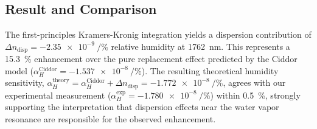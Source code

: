 \documentclass[aps,pra,reprint,groupedaddress,twocolumn,superscriptaddress]{revtex4-2}
\begin{document}
\subsection{Result and Comparison}

The first-principles Kramers-Kronig integration yields a dispersion contribution of $\Delta n_{\text{disp}} = \SI{-2.35e-9}{\per\percent}$ relative humidity at \SI{1762}{\nano\meter}. This represents a \SI{15.3}{\percent} enhancement over the pure replacement effect predicted by the Ciddor model ($\alpha_H^{\text{Ciddor}} = \SI{-1.537e-8}{\per\percent}$). The resulting theoretical humidity sensitivity, $\alpha_H^{\text{theory}} = \alpha_H^{\text{Ciddor}} + \Delta n_{\text{disp}} = \SI{-1.772e-8}{\per\percent}$, agrees with our experimental measurement ($\alpha_H^{\text{exp}} = \SI{-1.780e-8}{\per\percent}$) within \SI{0.5}{\percent}, strongly supporting the interpretation that dispersion effects near the water vapor resonance are responsible for the observed enhancement.

\nocite{*}


\end{document}
